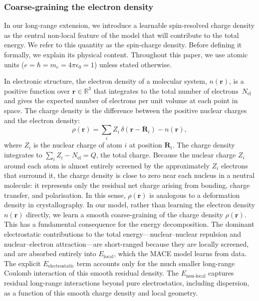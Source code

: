 \documentclass[aps,%
superscriptaddress,
 amsmath,amssymb,
floatfix,
twocolumn
]{revtex4-2}
\newcommand{\R}{\mathbb{R}}
\begin{document}
\subsubsection{Coarse-graining the electron density}

In our long-range extension, we introduce a learnable spin-resolved charge
density as the central non-local feature of the model that will contribute to the total energy. We refer to this quantity as the spin-charge density. Before defining it
formally, we explain its physical content. Throughout this paper, we use atomic units ($e=\hbar=m_e=4\pi\epsilon_0=1$) unless stated otherwise.

In electronic structure, the electron density of a molecular
system, $n(\mathbf{r})$, is a positive function over $\mathbf{r} \in \R^{3}$ that integrates
to the total number of electrons~$N_{\text{el}}$ and gives the expected number of electrons per unit volume at each point in space. The charge density is the difference between the positive nuclear charges and the electron density:
%
\begin{equation}
\rho(\mathbf{r})
  = \sum_i Z_i\,\delta(\mathbf{r} - \mathbf{R}_i)
  - n(\mathbf{r}),
\label{eq:charge-dens-def}
\end{equation}
%
where $Z_i$ is the nuclear charge of atom $i$ at position $\mathbf{R}_i$.
The charge density integrates to $\sum_i Z_i - N_{\text{el}} = Q$, the total
charge.
Because the nuclear charge $Z_i$ around each atom is
almost entirely screened by the approximately $Z_i$ electrons that
surround it, the charge density is close to zero near each nucleus in
a neutral molecule: it represents only the residual net
charge arising from bonding, charge transfer, and polarisation. In
this sense, $\rho(\mathbf{r})$ is analogous to a deformation density
in crystallography.
In our model, rather than learning the electron density
$n(\mathbf{r})$ directly, we learn a smooth coarse-graining of the charge density $\rho(\mathbf{r})$.
This has a fundamental consequence for the energy decomposition. The
dominant electrostatic contributions to the total
energy---nuclear--nuclear repulsion and nuclear--electron
attraction---are short-ranged because they are locally screened, and
are absorbed entirely into $E_{\text{local}}$, which the MACE model
learns from data. The explicit $E_{\text{electrostatic}}$ term
accounts only for the much smaller long-range Coulomb interaction of
this smooth residual density. The $E_{\text{non-local}}$ captures residual long-range interactions beyond pure electrostatics, including dispersion, as a function of this smooth charge density and local geometry.
\end{document}
